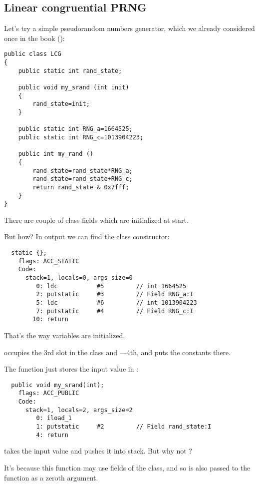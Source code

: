 \subsection{Linear congruential \ac{PRNG}}

Let's try a simple pseudorandom numbers generator, 
which we already considered once in the book ():


\begin{lstlisting}
public class LCG 
{
	public static int rand_state;

	public void my_srand (int init)
	{
		rand_state=init;
	}

	public static int RNG_a=1664525;
	public static int RNG_c=1013904223;

	public int my_rand ()
	{
		rand_state=rand_state*RNG_a;
		rand_state=rand_state+RNG_c;
		return rand_state & 0x7fff;
	}
}
\end{lstlisting}

There are couple of class fields which are initialized at start.

But how?
In  output we can find the class constructor:


\begin{lstlisting}
  static {};
    flags: ACC_STATIC
    Code:
      stack=1, locals=0, args_size=0
         0: ldc           #5         // int 1664525
         2: putstatic     #3         // Field RNG_a:I
         5: ldc           #6         // int 1013904223
         7: putstatic     #4         // Field RNG_c:I
        10: return        
\end{lstlisting}

That's the way variables are initialized.

 occupies the 3rd slot in the class and ---4th, 
and  puts the constants there.


The  function just stores the input value in :


\begin{lstlisting}
  public void my_srand(int);
    flags: ACC_PUBLIC
    Code:
      stack=1, locals=2, args_size=2
         0: iload_1       
         1: putstatic     #2         // Field rand_state:I
         4: return        
\end{lstlisting}

 takes the input value and pushes it into stack. But why not ?

It's because this function may use fields of the class, and so  is also passed to
the function as a zeroth argument.

